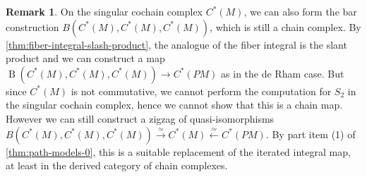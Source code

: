 \documentclass{scrartcl}
\let\emph\relax
\theoremstyle{plain}
\theoremstyle{definition}
\newtheorem{definition}[theorem]{Definition}
\newtheorem{remark}[theorem]{Remark}
\newcommand{\slant}{\mathbin{/}}
\newcommand{\quiso}{\simeq}
\let\xto\xrightarrow
\let\xfrom\xleftarrow
\DeclareMathOperator{\BC}{B}
\newcommand{\blank}{-}
\newcommand{\comp}{\mathbin{\circ}}
\begin{document}
\begin{remark}
    On the singular cochain complex $C^*(M)$, we can also form the bar construction $B(C^*(M), C^*(M), C^*(M))$, which is still a chain complex. By \cref{thm:fiber-integral-slash-product}, the analogue of the fiber integral is the slant product and we can construct a map $\BC(C^*(M), C^*(M), C^*(M)) \to C^*(PM)$ as in the de Rham case. But since $C^*(M)$ is not commutative, we cannot perform the computation for $S_2$ in the singular cochain complex, hence we cannot show that this is a chain map. However we can still construct a zigzag of quasi-isomorphisms $B(C^*(M), C^*(M), C^*(M)) \xto{\quiso} C^*(M) \xfrom{\quiso} C^*(PM)$. By part item (1) of \cref{thm:path-models-0}, this is a suitable replacement of the iterated integral map, at least in the derived category of chain complexes.
\end{remark}

\end{document}

